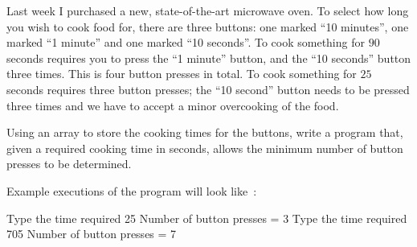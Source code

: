 
Last week I purchased a new, state-of-the-art microwave oven.
To select how long you wish to cook food for, there are three
buttons: one marked ``10 minutes'', one marked ``1 minute'' and
one marked ``10 seconds''.
To cook something for $90$ seconds requires you to press
the ``1 minute'' button, and the ``10 seconds'' button three
times. This is four button presses in total.
To cook something for $25$ seconds requires three button presses;
the ``10 second'' button needs to be pressed three times and we
have to accept a minor overcooking of the food.

\begin{exercise}
Using an array to store the cooking times for the buttons, 
write a program that, given a required cooking time
in seconds, allows the minimum number of button presses to be determined.

Example executions of the program will look like~:
\begin{terminaloutput}
Type the time required
25
Number of button presses = 3
Type the time required
705
Number of button presses = 7
\end{terminaloutput}
\end{exercise}

